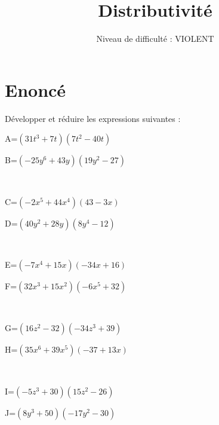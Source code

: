 \documentclass{article}%
\title{Distributivité}%
\author{Niveau de difficulté : VIOLENT}%
\date{{}}%
\begin{document}
%
\normalsize%
\pagestyle{empty}%
\maketitle%
\section{Enoncé}%
\label{sec:Enonc}%
Développer et réduire les expressions suivantes :%
\newline%
%
\newline%
%
\begin{minipage}{0.5\textwidth}%
A=$(31t^3+7t)(7t^2-40t)$\\%
\end{minipage}%
\begin{minipage}{0.5\textwidth}%
B=$(-25y^6+43y)(19y^2-27)$\\%
\end{minipage}%
\\%
\begin{minipage}{0.5\textwidth}%
C=$(-2x^5+44x^4)(43-3x)$\\%
\end{minipage}%
\begin{minipage}{0.5\textwidth}%
D=$(40y^2+28y)(8y^4-12)$\\%
\end{minipage}%
\\%
\begin{minipage}{0.5\textwidth}%
E=$(-7x^4+15x)(-34x+16)$\\%
\end{minipage}%
\begin{minipage}{0.5\textwidth}%
F=$(32x^3+15x^2)(-6x^5+32)$\\%
\end{minipage}%
\\%
\begin{minipage}{0.5\textwidth}%
G=$(16z^2-32)(-34z^3+39)$\\%
\end{minipage}%
\begin{minipage}{0.5\textwidth}%
H=$(35x^6+39x^5)(-37+13x)$\\%
\end{minipage}%
\\%
\begin{minipage}{0.5\textwidth}%
I=$(-5z^3+30)(15z^2-26)$\\%
\end{minipage}%
\begin{minipage}{0.5\textwidth}%
J=$(8y^3+50)(-17y^2-30)$\\%
\end{minipage}%
\end{document}
